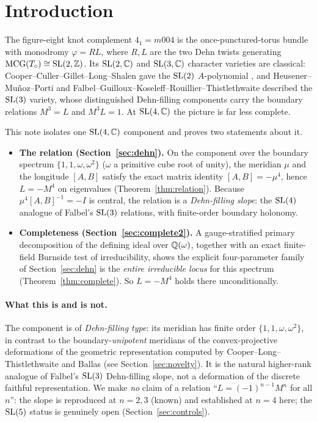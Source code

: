 \section{Introduction}
\label{sec:intro}

The figure-eight knot complement $4_1=m004$ is the once-punctured-torus bundle with monodromy
$\varphi=RL$, where $R,L$ are the two Dehn twists generating $\mathrm{MCG}(T_\circ)\cong\mathrm{SL}(2,\mathbb{Z})$. Its
$\mathrm{SL}(2,\mathbb{C})$ and $\mathrm{SL}(3,\mathbb{C})$ character varieties are classical: Cooper--Culler--Gillet--Long--Shalen gave
the $\mathrm{SL}(2)$ $A$-polynomial \cite{ccgls1994}, and Heusener--Mu\~noz--Porti \cite{hmp2016} and
Falbel--Guilloux--Koseleff--Rouillier--Thistlethwaite \cite{fgkrt2014} described the $\mathrm{SL}(3)$ variety,
whose distinguished Dehn-filling components carry the boundary relations $M^3=L$ and $M^3L=1$. At
$\mathrm{SL}(4,\mathbb{C})$ the picture is far less complete.

This note isolates one $\mathrm{SL}(4,\mathbb{C})$ component and proves two statements about it.

\begin{itemize}[leftmargin=1.4em]
\item \textbf{The relation (Section~\ref{sec:dehn}).} On the component over the boundary spectrum
  $\{1,1,\omega,\omega^2\}$ ($\omega$ a primitive cube root of unity), the meridian $\mu$ and the
  longitude $[A,B]$ satisfy the exact matrix identity $[A,B]=-\mu^4$, hence $L=-M^4$ on eigenvalues
  (Theorem~\ref{thm:relation}). Because $\mu^4[A,B]^{-1}=-I$ is central, the relation is a
  \emph{Dehn-filling slope}: the $\mathrm{SL}(4)$ analogue of Falbel's $\mathrm{SL}(3)$ relations, with finite-order
  boundary holonomy.
\item \textbf{Completeness (Section~\ref{sec:complete2}).} A gauge-stratified primary decomposition of the
  defining ideal over $\mathbb{Q}(\omega)$, together with an exact finite-field Burnside test of irreducibility,
  shows the explicit four-parameter family of Section~\ref{sec:dehn} is the \emph{entire irreducible
  locus} for this spectrum (Theorem~\ref{thm:complete}). So $L=-M^4$ holds there unconditionally.
\end{itemize}

\paragraph{\textmd{\textbf{What this is and is not.}}} The component is of \emph{Dehn-filling type}: its
meridian has finite order $\{1,1,\omega,\omega^2\}$, in contrast to the boundary-\emph{unipotent}
meridians of the convex-projective deformations of the geometric representation computed by
Cooper--Long--Thistlethwaite \cite{cooperlongthistlethwaite2006} and Ballas \cite{ballas2015}
(see Section~\ref{sec:novelty}). It is the natural higher-rank analogue of Falbel's $\mathrm{SL}(3)$ Dehn-filling
slope, not a deformation of the discrete faithful representation. We make \emph{no} claim of a relation
``$L=(-1)^{n-1}M^n$ for all $n$'': the slope is reproduced at $n=2,3$ (known) and established at $n=4$
here; the $\mathrm{SL}(5)$ status is genuinely open (Section~\ref{sec:controls}).

